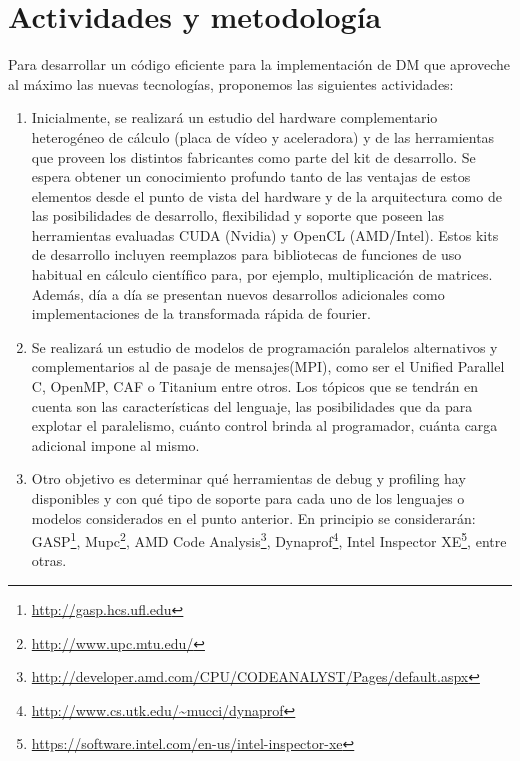 \documentclass[a4paper,10pt]{article}
\begin{document}
\section*{Actividades y metodolog\'ia}

Para desarrollar un c\'odigo eficiente para la implementaci\'on de DM que aproveche al m\'aximo las nuevas tecnolog\'ias, proponemos las siguientes actividades: 

\begin{enumerate}
\item Inicialmente, se realizar\'a un estudio del hardware complementario heterog\'eneo de c\'alculo (placa de v\'ideo y aceleradora) y de las herramientas que proveen los distintos fabricantes como parte del kit de desarrollo. Se espera obtener un conocimiento profundo tanto de las ventajas de estos elementos desde el punto de vista del hardware y de la arquitectura como de las posibilidades de desarrollo,  flexibilidad y soporte que poseen las herramientas evaluadas CUDA (Nvidia) y OpenCL (AMD/Intel).
Estos kits de desarrollo incluyen reemplazos para bibliotecas de funciones de uso habitual en c\'alculo cient\'ifico para, por ejemplo, multiplicaci\'on de matrices.
Adem\'as, d\'ia a d\'ia se presentan nuevos desarrollos adicionales como implementaciones de la transformada r\'apida de fourier.

\item Se realizar\'a un estudio de modelos de programaci\'on paralelos alternativos y complementarios al de pasaje de mensajes(MPI), como ser el Unified Parallel C, OpenMP, CAF o Titanium entre otros.
Los t\'opicos que se tendr\'an en cuenta son las caracter\'isticas del lenguaje, las posibilidades que da para explotar el paralelismo, cu\'anto control brinda al programador, cu\'anta carga adicional impone al mismo. \label{lenguajes_2}

\item Otro objetivo es determinar qu\'e herramientas de debug y profiling hay disponibles y con qu\'e tipo de soporte para cada uno de los lenguajes o modelos considerados en el punto anterior.
En principio se considerar\'an: GASP\footnote{\url{http://gasp.hcs.ufl.edu}}, Mupc\footnote{\url{http://www.upc.mtu.edu/}}, AMD Code Analysis\footnote{\url{http://developer.amd.com/CPU/CODEANALYST/Pages/default.aspx}}, Dynaprof\footnote{\url{http://www.cs.utk.edu/~mucci/dynaprof}}, Intel Inspector XE\footnote{\url{https://software.intel.com/en-us/intel-inspector-xe}}, entre otras.


\end{enumerate}
\end{document}
